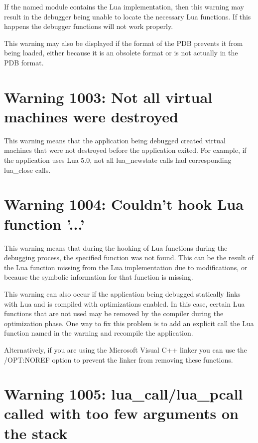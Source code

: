 If the named module contains the Lua implementation, then this warning may result in the debugger
being unable to locate the necessary Lua functions. If this happens the debugger functions will
not work properly.

This warning may also be displayed if the format of the PDB prevents it from being loaded, either
because it is an obsolete format or is not actually in the PDB format.

\section{Warning 1003: Not all virtual machines were destroyed}\label{warning_1003}

This warning means that the application being debugged created virtual machines that were not
destroyed before the application exited. For example, if the application uses Lua 5.0, not all
lua_newstate calls had corresponding lua_close calls.

\section{Warning 1004: Couldn't hook Lua function '...'}\label{warning_1004}

This warning means that during the hooking of Lua functions during the debugging process,
the specified function was not found. This can be the result of the Lua function missing
from the Lua implementation due to modifications, or because the symbolic information for
that function is missing.

This warning can also occur if the application being debugged statically links with Lua and is
compiled with optimizations enabled. In this case, certain Lua functions that are not used
may be removed by the compiler during the optimization phase.  One way to fix this problem is
to add an explicit call the Lua function named in the warning and recompile the application.

Alternatively, if you are using the Microsoft Visual C++ linker you can use the /OPT:NOREF
option to prevent the linker from removing these functions.

\section{Warning 1005: lua_call/lua_pcall called with too few arguments on the stack}\label{warning_1005}

